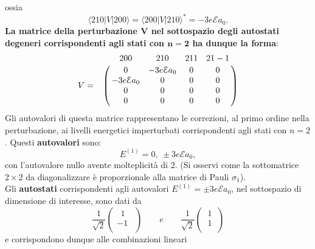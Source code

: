 ossia 
\begin{equation} 
\langle 210|V|200\rangle= \langle 200 |V |210 \rangle^*=-3e\mathcal{E}a_0. 
\end{equation}
\textbf{La matrice della perturbazione $\boldsymbol{V}$ nel sottospazio degli autostati degeneri corrispondenti agli stati con $\boldsymbol{n=2}$ ha dunque la forma}:
\begin{equation}  
V=
\bordermatrix{~&200&210&211&21-1\cr
& 0 & -3e\mathcal{E}a_0 & 0 & 0 \cr
& -3e\mathcal{E}a_0 & 0 & 0 & 0 \cr
& 0 & 0 & 0 & 0 \cr
& 0 & 0 & 0 & 0 \cr}
\end{equation}
Gli autovalori di questa matrice rappresentano le correzioni, al primo ordine nella perturbazione, ai livelli energetici imperturbati corrispondenti agli stati con $n=2$. Questi \textbf{autovalori} sono:
\begin{equation} 
E^{(1)}=0, \ \pm 3e\mathcal{E}a_0,
\end{equation}
con l'autovalore nullo avente molteplicità di 2. (Si osservi come la sottomatrice $2\times2$ da diagonalizzare è proporzionale alla matrice di Pauli $\sigma_1$).\\
Gli \textbf{autostati} corrispondenti agli autovalori $E^{(1)}=\pm 3e\mathcal{E}a_0$, nel sottospazio di dimensione  di interesse, sono dati da
\begin{equation} 
\frac{1}{\sqrt{2}} \left(
\begin{array}{c}
\ \ 1 \ \ \\
-1 \ \ \\
\end{array}
\right)
\qquad e \qquad 
\frac{1}{\sqrt{2}} \left(
\begin{array}{c}
\ 1 \ \\
\ 1 \ \\
\end{array}
\right)
\end{equation}
e corrispondono dunque alle combinazioni lineari 


